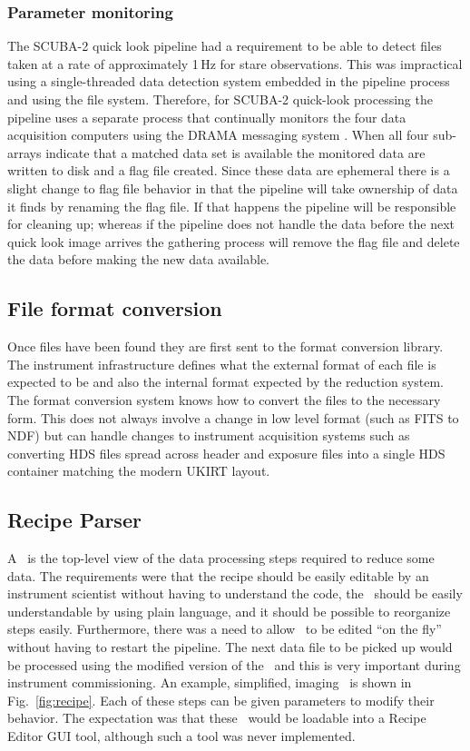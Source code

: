 \documentclass[final,authoryear,5p,times,twocolumn]{elsarticle}
\begin{document}
\subsubsection{Parameter monitoring}

The SCUBA-2 quick look pipeline \citep{2005ASPC..347..585G} had a
requirement to be able to detect files taken at a rate of
approximately 1\,Hz for stare observations. This was impractical using
a single-threaded data detection system embedded in the pipeline process and
using the file system. Therefore, for SCUBA-2 quick-look processing the
pipeline uses a separate process that continually monitors the
four data acquisition computers using the DRAMA messaging system
\citep{1995SPIE.2479...62B}. When all four sub-arrays indicate that a
matched data set is available the monitored data are written to disk
and a flag file created. Since these data are ephemeral there is a
slight change to flag file behavior in that the pipeline will take
ownership of data it finds by renaming the flag file. If that happens
the pipeline will be responsible for cleaning up; whereas if the
pipeline does not handle the data before the next quick look image
arrives the gathering process will remove the flag file and delete the
data before making the new data available.

\subsection{File format conversion}

Once files have been found they are first sent to the format
conversion library. The instrument infrastructure defines what the
external format of each file is expected to be and also the internal format
expected by the reduction system. The format conversion system knows
how to convert the files to the necessary form. This does not always
involve a change in low level format (such as FITS to NDF) but can
handle changes to instrument acquisition systems such as converting
HDS files spread across header and exposure files into a single HDS
container matching the modern UKIRT layout.

\subsection{Recipe Parser}

A \recipe\ is the top-level view of the data processing steps
required to reduce some data. The requirements were that the recipe
should be easily editable by an instrument scientist without having to
understand the code, the \recipe\ should be easily understandable by
using plain language, and it should be possible to reorganize steps
easily. Furthermore, there was a need to allow \recipes\ to be edited
``on the fly'' without having to restart the pipeline. The next data file
to be picked up would be processed using the modified version of the
\recipe\ and this is very important during instrument commissioning. An
example, simplified, imaging \recipe\ is shown in Fig.\
\ref{fig:recipe}. Each of these steps can be given parameters to
modify their behavior. The expectation was that these \recipes\ would
be loadable into a Recipe Editor GUI tool, although such a tool was
never implemented.
\end{document}

